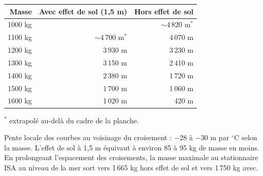 \documentclass[a4paper,12pt]{article}
\renewcommand{\deg}[1]{$#1^{\circ}$}  %
\begin{document}
\begin{center}
\small
\begin{tabular}{@{}rrr@{}}
\toprule
Masse & Avec effet de sol (1,5 m) & Hors effet de sol \\
\midrule
1000 kg & & $\sim$4\,820 m$^{*}$ \\
1100 kg & $\sim$4\,700 m$^{*}$ & 4\,070 m \\
1200 kg & 3\,930 m & 3\,230 m \\
1300 kg & 3\,150 m & 2\,410 m \\
1400 kg & 2\,380 m & 1\,720 m \\
1500 kg & 1\,700 m & 1\,060 m \\
1600 kg & 1\,020 m & 420 m \\
\bottomrule
\end{tabular}

{\scriptsize $^{*}$ extrapolé au-delà du cadre de la planche.}
\end{center}

Pente locale des courbes au voisinage du croisement : $-28$ à $-30$ m par
\deg{}C selon la masse. L'effet de sol à 1,5 m équivaut à environ 85 à
95 kg de masse en moins. En prolongeant l'espacement des croisements, la
masse maximale au stationnaire ISA au niveau de la mer sort vers 1\,665 kg
hors effet de sol et vers 1\,750 kg avec.
\end{document}
